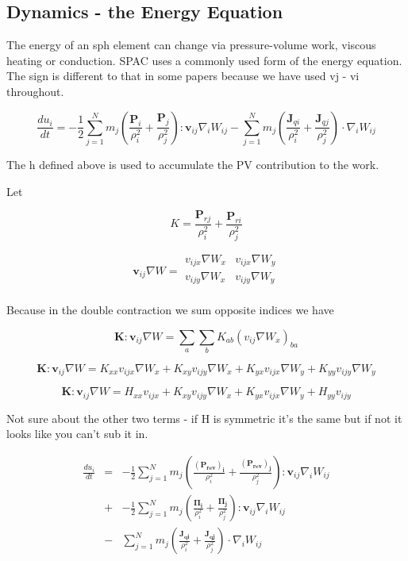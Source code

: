 \subsection{Dynamics - the Energy Equation}
The energy of an sph element can change via pressure-volume work, viscous
heating or conduction.  SPAC uses a commonly used form of the energy equation. 
The sign is different to that in some papers because we have used vj - vi throughout.

\begin{equation}
\label{energy_equation}
\frac{du_{i}}{dt} = - \frac{1}{2} \sum^{N}_{j=1} m_j \left( \frac{\mathbold{P}_{i}}
{\rho_{i}^{2}} + \frac{\mathbold{P}_{j}}{\rho_{j}^{2}}\right) : \mathbold{v}_{ij} 
\nabla_{i} W_{ij} - \sum^{N}_{j=1} m_{j} \left( \frac{\mathbold{J}_{qi}}{\rho_{i}^{2}} 
+ \frac{\mathbold{J}_{qj} }{\rho_{j}^{2}} \right) \cdot \nabla_{i} W_{ij}
\end{equation}

The h defined above is used to accumulate the PV contribution to the work.

Let 

\[
K = \frac{\mathbold{P}_{rj}}{\rho^{2}_{i}} 
   + \frac{\mathbold{P}_{ri} }{\rho^{2}_{j}}
\]

\[
\mathbf{v}_{ij} \nabla W = 
\begin{array}{ccc}
	v_{ijx} \nabla W_{x} & v_{ijx} \nabla W_{y} \\
	v_{ijy} \nabla W_{x} & v_{ijy} \nabla W_{y} \\
\end{array}
\]

Because in the double contraction we sum opposite indices we have

\[ \mathbf{K} : \mathbf{v}_{ij} \nabla W
= \sum_{a} \sum_{b} K_{ab} \left( v_{ij}  \nabla W_{x} \right)_{ba} \]

\[ \mathbf{K} : \mathbf{v}_{ij} \nabla W 
= K_{xx} v_{ijx} \nabla W_{x} 
+ K_{xy} v_{ijy} \nabla W_{x}
+ K_{yx} v_{ijx} \nabla W_{y}
+ K_{yy} v_{ijy} \nabla W_{y}  \]

\[ \mathbf{K} : \mathbf{v}_{ij} \nabla W 
= H_{xx} v_{ijx} 
+ K_{xy} v_{ijy} \nabla W_{x}
+ K_{yx} v_{ijx} \nabla W_{y}
+ H_{yy} v_{ijy} \]

Not sure about the other two terms - if H is symmetric
it's the same but if not it looks like you can't sub it in.


\begin{eqnarray}
\label{energy_equation_2}
\frac{du_{i}}{dt} &=& - \frac{1}{2} \sum^{N}_{j=1} m_j 
\left( \frac{\mathbold{(P_{rev})_{i}}}{\rho_{i}^{2}} 
+ \frac{\mathbold{(P_{rev})_{j}} }{\rho_{j}^{2}}\right) 
: \mathbold{v}_{ij} \nabla_{i} W_{ij} \\
&+& - \frac{1}{2} \sum^{N}_{j=1} m_j \left( \frac{\mathbold{\Pi_{i}}}{\rho_{i}^{2}} 
+ \frac{\mathbold{\Pi_{j}} }{\rho_{j}^{2}}\right) : \mathbold{v}_{ij} \nabla_{i} W_{ij} \\
&-& \sum^{N}_{j=1} m_{j} \left( \frac{\mathbold{J_{qi}}}{\rho_{i}^{2}} 
+ \frac{\mathbold{J_{qj}} }{\rho_{j}^{2}} \right) \cdot \nabla_{i} W_{ij}
\end{eqnarray}

